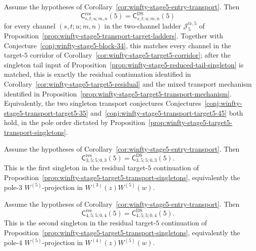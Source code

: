 \begin{conjecture}
\label{conj:winfty-stage5-transport-target-5}
\ClaimStatusConjectured{}
Assume the hypotheses of
Corollary~\ref{cor:winfty-stage5-entry-transport}.  Then
\[
\mathsf{C}^{\mathrm{res}}_{s,t;u;m,n}(5)
=
\mathsf{C}^{\mathrm{DS}}_{s,t;u;m,n}(5)
\]
for every channel $(s,t;u;m,n)$ in the two-channel ladder
$\mathcal{J}_5^{\mathrm{tr},5}$ of
Proposition~\ref{prop:winfty-stage5-transport-target-ladders}.  Together
with Conjecture~\ref{conj:winfty-stage5-block-34}, this matches every
channel in the target-$5$ corridor of
Corollary~\ref{cor:winfty-stage5-target5-corridor}; after the singleton
tail input of Proposition~\ref{prop:winfty-stage5-reduced-tail-singleton}
is matched, this is exactly the residual continuation identified in
Corollary~\ref{cor:winfty-stage5-target5-residual} and the mixed
transport mechanism identified in
Proposition~\ref{prop:winfty-stage5-target5-transport-mechanism}.
Equivalently, the two singleton transport conjectures
Conjectures~\ref{conj:winfty-stage5-transport-target5-35}
and~\ref{conj:winfty-stage5-transport-target5-45}
both hold, in the pole order dictated by
Proposition~\ref{prop:winfty-stage5-target5-transport-singletons}.
\end{conjecture}

\begin{conjecture}
\label{conj:winfty-stage5-transport-target5-35}
\ClaimStatusConjectured{}
Assume the hypotheses of
Corollary~\ref{cor:winfty-stage5-entry-transport}.  Then
\[
\mathsf{C}^{\mathrm{res}}_{3,5;5;0,3}(5)
=
\mathsf{C}^{\mathrm{DS}}_{3,5;5;0,3}(5).
\]
This is the first singleton in the residual target-$5$ continuation of
Proposition~\ref{prop:winfty-stage5-target5-transport-singletons},
equivalently the pole-$3$ $W^{(5)}$-projection in
$W^{(3)}(z)W^{(5)}(w)$.
\end{conjecture}

\begin{conjecture}
\label{conj:winfty-stage5-transport-target5-45}
\ClaimStatusConjectured{}
Assume the hypotheses of
Corollary~\ref{cor:winfty-stage5-entry-transport}.  Then
\[
\mathsf{C}^{\mathrm{res}}_{4,5;5;0,4}(5)
=
\mathsf{C}^{\mathrm{DS}}_{4,5;5;0,4}(5).
\]
This is the second singleton in the residual target-$5$ continuation of
Proposition~\ref{prop:winfty-stage5-target5-transport-singletons},
equivalently the pole-$4$ $W^{(5)}$-projection in
$W^{(4)}(z)W^{(5)}(w)$.
\end{conjecture}

